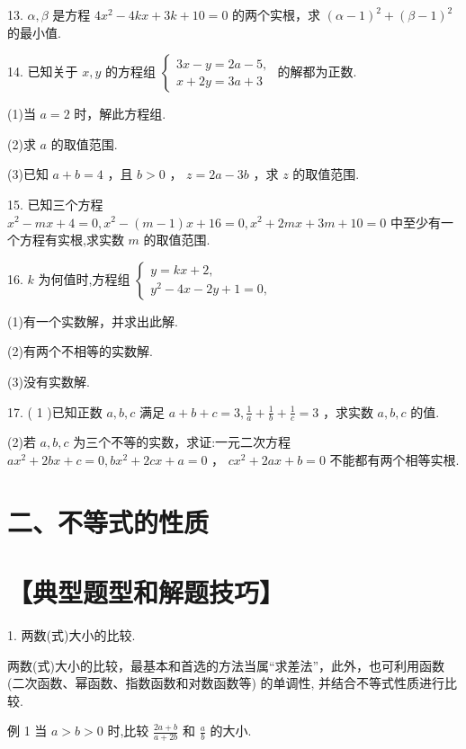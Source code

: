\documentclass[10pt]{article}
\begin{document}
13. \(\alpha ,\beta\) 是方程 \(4{x}^{2} - {4kx} + {3k} + {10} = 0\) 的两个实根，求 \({\left( \alpha  - 1\right) }^{2} + {\left( \beta  - 1\right) }^{2}\) 的最小值.

14. 已知关于 \(x,y\) 的方程组 \(\left\{  \begin{array}{l} {3x} - y = {2a} - 5, \\  x + {2y} = {3a} + 3 \end{array}\right.\) 的解都为正数.

(1)当 \(a = 2\) 时，解此方程组.

(2)求 \(a\) 的取值范围.

(3)已知 \(a + b = 4\) ，且 \(b > 0\) ， \(z = {2a} - {3b}\) ，求 \(z\) 的取值范围.

15. 已知三个方程 \({x}^{2} - {mx} + 4 = 0,{x}^{2} - \left( {m - 1}\right) x + {16} = 0,{x}^{2} + {2mx} + {3m} + {10} = 0\) 中至少有一个方程有实根,求实数 \(m\) 的取值范围.

16. \(k\) 为何值时,方程组 \(\left\{  \begin{array}{l} y = {kx} + 2, \\  {y}^{2} - {4x} - {2y} + 1 = 0, \end{array}\right.\)

(1)有一个实数解，并求出此解.

(2)有两个不相等的实数解.

(3)没有实数解.

17. ( 1 )已知正数 \(a,b,c\) 满足 \(a + b + c = 3,\frac{1}{a} + \frac{1}{b} + \frac{1}{c} = 3\) ，求实数 \(a,b,c\) 的值.

(2)若 \(a,b,c\) 为三个不等的实数，求证:一元二次方程 \(a{x}^{2} + {2bx} + c = 0,b{x}^{2} + {2cx} + a = 0\) ， \(c{x}^{2} + {2ax} + b = 0\) 不能都有两个相等实根.

\section*{二、不等式的性质}

\section*{【典型题型和解题技巧】}

1. 两数(式)大小的比较.

两数(式)大小的比较，最基本和首选的方法当属“求差法”，此外，也可利用函数(二次函数、幂函数、指数函数和对数函数等) 的单调性, 并结合不等式性质进行比较.

例 1 当 \(a > b > 0\) 时,比较 \(\frac{{2a} + b}{a + {2b}}\) 和 \(\frac{a}{b}\) 的大小.
\end{document}

